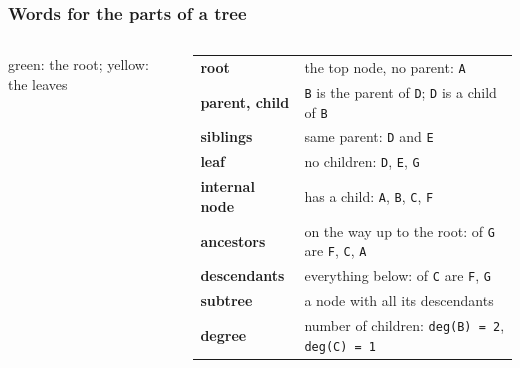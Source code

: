 \documentclass[aspectratio=169,10pt,compress]{beamer}
\begin{document}




\begin{frame}[t,fragile] \frametitle{Words for the parts of a tree}
  \begin{columns}[T]
    \begin{column}{0.4\textwidth}
      \begin{center}
      \end{center}
      \small green: the root; yellow: the leaves
    \end{column}
    \begin{column}{0.58\textwidth}
      \small
      \begin{tabular}{lL{0.62\textwidth}}
        \toprule
        \textbf{root}            & the top node, no parent: \texttt{A} \\
        \textbf{parent, child}   & \texttt{B} is the parent of \texttt{D}; \texttt{D} is a child of \texttt{B} \\
        \textbf{siblings}        & same parent: \texttt{D} and \texttt{E} \\
        \textbf{leaf}            & no children: \texttt{D}, \texttt{E}, \texttt{G} \\
        \textbf{internal node}   & has a child: \texttt{A}, \texttt{B}, \texttt{C}, \texttt{F} \\
        \textbf{ancestors}       & on the way up to the root: of \texttt{G} are \texttt{F}, \texttt{C}, \texttt{A} \\
        \textbf{descendants}     & everything below: of \texttt{C} are \texttt{F}, \texttt{G} \\
        \textbf{subtree}         & a node with all its descendants \\
        \textbf{degree}          & number of children: \texttt{deg(B) = 2}, \texttt{deg(C) = 1} \\
        \bottomrule
      \end{tabular}
    \end{column}
  \end{columns}
\end{frame}
\end{document}
